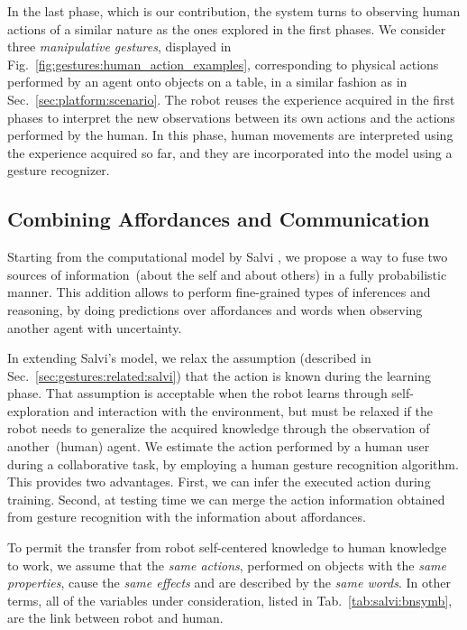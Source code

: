 In the last phase, which is our contribution, the system turns to observing human actions of a similar nature as the ones explored in the first phases.
We consider three \emph{manipulative gestures}, displayed in Fig.~\ref{fig:gestures:human_action_examples}, corresponding to physical actions performed by an agent onto objects on a table, in a similar fashion as in Sec.~\ref{sec:platform:scenario}.
The robot reuses the experience acquired in the first phases to interpret the new observations between its own actions and the actions performed by the human.
In this phase, human movements are interpreted using the experience acquired so far, and they are incorporated into the model using a gesture recognizer.

\subsection{Combining Affordances and Communication}
\label{sec:gestures:approach:affgest}

Starting from the \AffWords{} computational model by Salvi \cite{salvi:2012:smcb},
we propose a way to fuse two sources of information~(about the self and about others) in a fully probabilistic manner.
This addition allows to perform fine-grained types of inferences and reasoning, by doing predictions over affordances and words when observing another agent with uncertainty.

In extending Salvi's model, we relax the assumption (described in Sec.~\ref{sec:gestures:related:salvi}) that the action is known during the learning phase.
That assumption is acceptable when the robot learns through self-exploration and interaction with the environment, but must be relaxed if the robot needs to generalize the acquired knowledge through the observation of another~(human) agent.
We estimate the action performed by a human user during a \hr{} collaborative task, by employing a human gesture recognition algorithm.
This provides two advantages.
First, we can infer the executed action during training.
Second, at testing time we can merge the action information obtained from gesture recognition with the information about affordances.

To permit the transfer from robot self-centered knowledge to human knowledge to work, we assume that the \emph{same actions}, performed on objects with the \emph{same properties}, cause the \emph{same effects} and are described by the \emph{same words}.
In other terms, all of the variables under consideration, listed in Tab.~\ref{tab:salvi:bnsymb}, are the link between robot and human.

